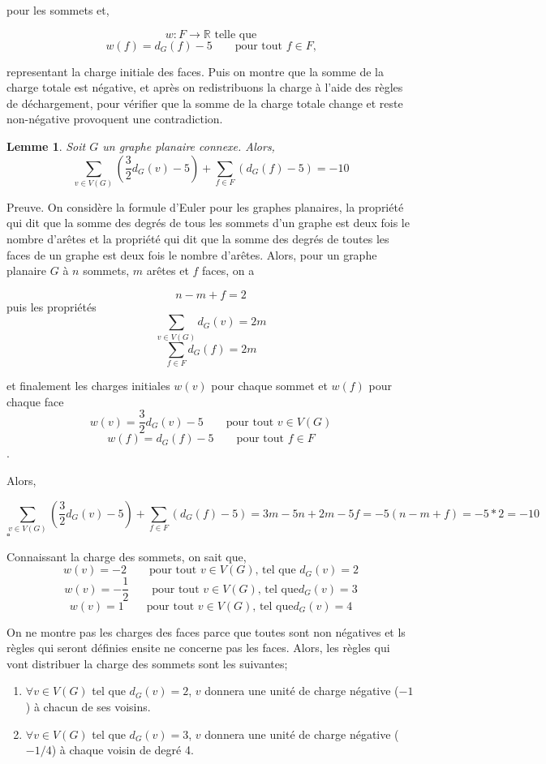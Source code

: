 \documentclass[10pt,a4paper]{article}
\newtheorem{lemme}{Lemme}
\newcommand{\ep}{{\hfill $\square$}}
\begin{document}
pour les sommets et,

$$w: F \to \mathbb{R} \textrm{ telle que} $$
 $$w(f) = d_G(f) - 5 \qquad \textrm{pour tout $f\in F$,}$$
 
representant la charge initiale des faces. Puis on montre que la somme de la charge totale est négative, et après on redistribuons la charge à l'aide des règles de déchargement, pour vérifier que la somme de la charge totale change et reste non-négative provoquent une contradiction.

\begin{lemme}
Soit $G$ un graphe planaire connexe. Alors,
$$ \sum_{v \in V(G)} (\frac{3}{2} d_G(v) - 5) + \sum_{f\in F} (d_G(f) -5) = -10$$
\end{lemme}

Preuve.
On considère la formule d'Euler pour les graphes planaires, la propriété qui dit que la somme des degrés de tous les sommets d'un graphe est deux fois le nombre d'arêtes et la propriété qui dit que la somme des degrés de toutes les faces de un graphe est deux fois le nombre d'arêtes. Alors, pour un graphe planaire $G$ à $n$ sommets, $m$ arêtes et $f$ faces, on a

$$ n - m + f = 2 $$
puis les propriétés
$$ \sum_{v\in V(G)} d_G(v) = 2m$$
$$ \sum_{f\in F} d_G(f) = 2m$$

et finalement les charges initiales $w(v)$ pour chaque sommet et $w(f)$ pour chaque face
$$ w(v) = \frac{3}{2}d_G(v) - 5 \qquad \textrm{pour tout $v \in V(G)$}$$
$$ w(f) = d_G(f) - 5 \qquad \textrm{pour tout $f \in F$}$$.

Alors,

$$ \sum_{v \in V(G)} (\frac{3}{2}d_G(v) - 5) + \sum_{f\in F} (d_G(f) -5) = 3m -5n + 2m - 5f = -5(n - m + f) = -5*2 = -10$$
\ep 

Connaissant la charge des sommets, on sait que,
$$ w(v) = -2 \qquad \textrm{pour tout $v \in V(G)$, tel que } d_G(v) = 2$$
$$ w(v) = -\frac{1}{2} \qquad \textrm{pour tout $v \in V(G)$, tel que} d_G(v) = 3$$
$$ w(v) =  1 \qquad \textrm{pour tout $v \in V(G)$, tel que} d_G(v) = 4$$

On ne montre pas les charges des faces parce que toutes sont non négatives et ls règles qui seront définies ensite ne concerne pas les faces. Alors, les règles qui vont distribuer la charge des sommets sont les suivantes;

\begin{enumerate}
\item $\forall v \in V(G)$ tel que $d_G(v) = 2$, $v$ donnera une unité de charge négative ($-1$) à chacun de ses voisins.
\item $\forall v \in V(G)$ tel que $d_G(v) = 3$, $v$ donnera une unité de charge négative ($-1/4$) à chaque voisin de degré 4.
\end{enumerate}
\end{document}
